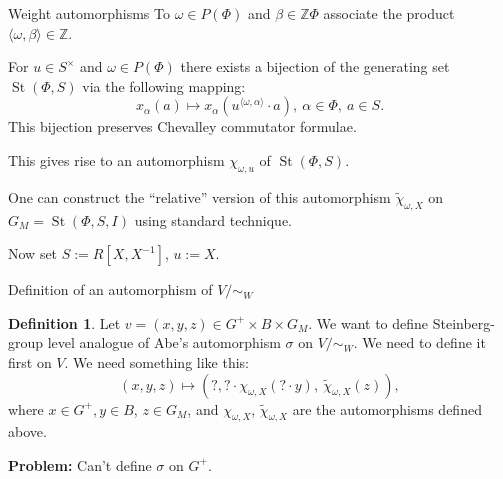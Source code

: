 \documentclass{beamer} %
\DeclareMathOperator{\St}{St}
\theoremstyle{definition}
\newtheorem*{dfn}{Definition}
\begin{document}
\begin{frame}{Weight automorphisms}
 To $\omega \in P(\Phi)$ and $\beta \in \mathbb{Z} \Phi$ associate the product $\langle \omega, \beta\rangle \in \mathbb{Z}$.
\pause

 For $u \in S^\times$ and $\omega \in P(\Phi)$ there exists a bijection of the generating set $\St(\Phi, S)$ via the following mapping:
 \[ x_\alpha(a) \mapsto x_\alpha(u^{\langle\omega, \alpha\rangle} \cdot a),\ \alpha\in \Phi,\ a \in S. \]
\pause This bijection preserves Chevalley commutator formulae.

\pause This gives rise to an automorphism $\chi_{\omega, u}$ of $\St(\Phi, S)$.

\pause One can construct the ``relative'' version of this automorphism $\widetilde{\chi}_{\omega, X}$ on $G_M = \St(\Phi, S, I)$ using standard technique.

\pause Now set $S := R[X, X^{-1}]$, $u := X$.
\end{frame}

\begin{frame}{Definition of an automorphism of $V/\sim_W$}
 \begin{dfn} \label{sigma-def}
Let $v = (x, y, z) \in G^+ \times B \times G_M$.
We want to define Steinberg-group level analogue of Abe's automorphism $\sigma$ on $V/\sim_W$.
We need to define it first on $V$. We need something like this:
\begin{equation} \label{eq:sigma-def} (x, y, z) \mapsto (?, ? \cdot \chi_{\omega, X}(? \cdot y),\  \widetilde{\chi}_{\omega, X}(z)), \end{equation}
where $x \in G^+, y \in B$, $z \in G_M$, and
$\chi_{\omega, X}$, $\widetilde{\chi}_{\omega, X}$ are the automorphisms defined above.
\end{dfn}
\pause \textbf{Problem: } Can't define $\sigma$ on $G^+$.
\end{frame}
\end{document}
